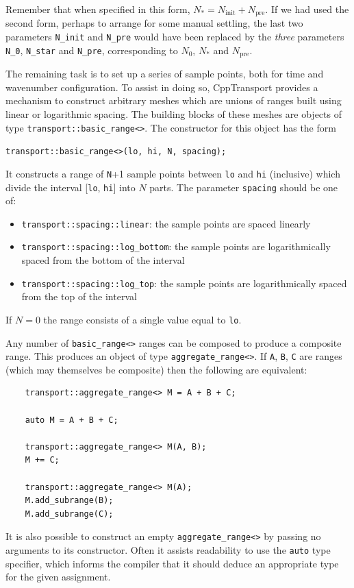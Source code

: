 \documentclass[11pt,a4paper]{article}
\newcommand{\Ninit}{N_{\text{init}}}
\newcommand{\Nstar}{N_{\ast}}
\newcommand{\Npre}{N_{\text{pre}}}
\newcommand{\Nzero}{N_{0}}
\newcommand{\packagefont}{\sffamily}
\newcommand{\CppTransport}{{\packagefont CppTransport}}
\newcommand{\semibold}[1]{{\fontseries{b}\selectfont{#1}}}
\newcommand{\para}[1]{\par\vspace{2mm}\noindent\semibold{{#1.}---}\ignorespaces}
\begin{document}
Remember that when specified in this form, $\Nstar = \Ninit + \Npre$.
If we had used the second form, perhaps to arrange for some manual settling,
the last two parameters
\texttt{N_init} and
\texttt{N_pre}
would have been replaced by the \emph{three} parameters
\texttt{N_0},
\texttt{N_star}
and
\texttt{N_pre},
corresponding to $\Nzero$, $\Nstar$ and $\Npre$.

\para{Selecting a mesh of time sample points}
The remaining task is to set up a series of sample points, both for
time and wavenumber configuration.
To assist in doing so, {\CppTransport} provides a mechanism
to construct arbitrary meshes which are unions
of ranges built using
linear or logarithmic spacing.
The building blocks of these meshes
are objects of type
\texttt{transport::basic_range<>}. The constructor for
this object has the form
\begin{center}
    \texttt{transport::basic_range<>(lo, hi, N, spacing);}    
\end{center}
It constructs a range of \texttt{N}+1 sample points between
\texttt{lo}
and
\texttt{hi}
(inclusive)
which divide the interval
[\texttt{lo}, \texttt{hi}] into $N$ parts.
The parameter \texttt{spacing} should be one of:
\begin{itemize}
    \item \texttt{transport::spacing::linear}: the sample points
    are spaced linearly
    
    \item \texttt{transport::spacing::log_bottom}: the sample
    points are logarithmically spaced from the bottom of the interval
    
    \item \texttt{transport::spacing::log_top}: the sample points are
    logarithmically spaced from the top of the interval
\end{itemize}
If $N=0$ the range consists of a single
value equal to \texttt{lo}.

Any number of \texttt{basic_range<>} ranges can be
composed to produce a composite range.
This produces an object of type
\texttt{aggregate_range<>}.
If \texttt{A}, \texttt{B}, \texttt{C}
are ranges (which may themselves be composite) then
the following are equivalent:
\begin{verbatim}
    transport::aggregate_range<> M = A + B + C;
    
    auto M = A + B + C;
    
    transport::aggregate_range<> M(A, B);
    M += C;
    
    transport::aggregate_range<> M(A);
    M.add_subrange(B);
    M.add_subrange(C);
\end{verbatim}
It is also possible to construct an empty
\texttt{aggregate_range<>} by passing no arguments to its
constructor.
Often it assists readability to use the \texttt{auto} type specifier,
which informs the compiler that it should deduce an appropriate type
for the given assignment.
\end{document}
